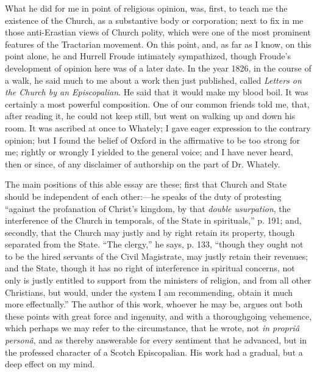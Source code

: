 What he did for me in point of religious opinion, was,
first, to teach me the existence of the Church, as a
substantive body or corporation; next to fix in me those anti-Erastian
views of Church polity, which were one of the most prominent features
of the Tractarian movement. On this point, and, as far as I know, on
this point alone, he and Hurrell Froude intimately sympathized, though
Froude's development of opinion here was of a later date. In the year
1826, in the course of a walk, he said much to me about a work
then just published, called \emph{Letters on the Church by an
Episcopalian}. He said that it would make my blood boil. It was
certainly a most powerful composition. One of our common friends told
me, that, after reading it, he could not keep still, but went on
walking up and down his room. It was ascribed at once to Whately; I
gave eager expression to the contrary opinion; but I found the belief
of Oxford in the affirmative to be too strong for me; rightly or
wrongly I yielded to the general voice; and I have never heard, then
or since, of any disclaimer of authorship on the part of Dr. Whately.

The main positions of this able essay are these; first that Church
and State should be independent of each other:—he speaks of the duty
of protesting ``against the profanation of Christ's kingdom, by
that \emph{double usurpation}, the interference of the Church in
temporals, of the State in spirituals,'' p. 191; and, secondly,
that the Church may justly and by right retain its property, though
separated from the State. ``The clergy,'' he says, p. 133,
``though they ought not to be the hired servants of the Civil
Magistrate, may justly retain their revenues; and the State,
though it has no right of interference in spiritual concerns, not only
is justly entitled to support from the ministers of religion, and from
all other Christians, but would, under the system I am recommending,
obtain it much more effectually.'' The author of this work,
whoever he may be, argues out both these points with great force and
ingenuity, and with a thoroughgoing vehemence, which perhaps we may
refer to the circumstance, that he wrote, not \emph{in propriâ personâ},
and as thereby answerable for every sentiment that he
advanced, but in the professed character of a Scotch Episcopalian.
His work had a gradual, but a deep effect on my mind.

